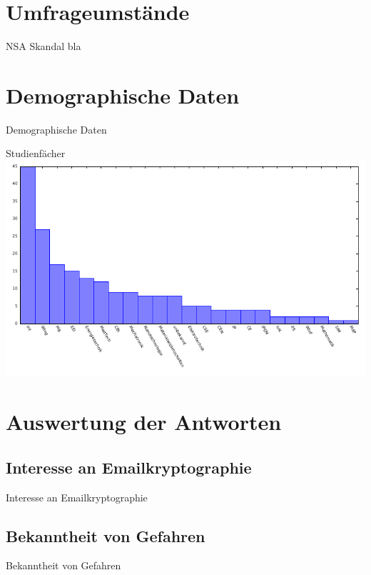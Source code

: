 \documentclass[]{beamer}
\begin{document}
\section{Umfrageumstände}
\begin{frame}{NSA Skandal}
	bla
\end{frame}

\section{Demographische Daten}
\begin{frame}{Demographische Daten}
	\begin{center}
		Studienfächer
	\includegraphics[scale=0.9]{plots/stud.pdf}
	\end{center}
\end{frame}

\section{Auswertung der Antworten}
\subsection{Interesse an Emailkryptographie}
\begin{frame}{Interesse an Emailkryptographie}
	
\end{frame}

\subsection{Bekanntheit von Gefahren}
\begin{frame}{Bekanntheit von Gefahren}
	
\end{frame}
\end{document}
